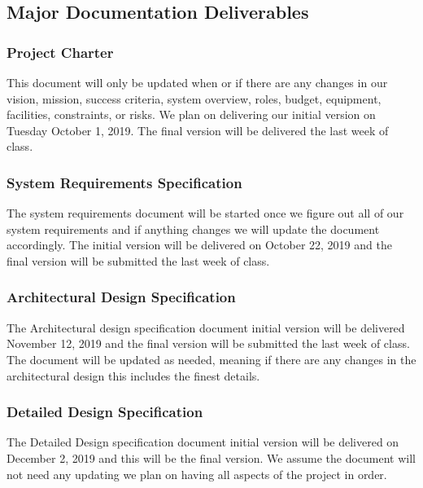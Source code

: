 
\subsection{Major Documentation Deliverables}
\subsubsection{Project Charter}
This document will only be updated when or if there are any changes in our vision, mission, success criteria, system overview, roles, budget, equipment, facilities, constraints, or risks. We plan on delivering our initial version on Tuesday October 1, 2019. The final version will be delivered the last week of class.
\subsubsection{System Requirements Specification}
The system requirements document will be started once we figure out all of our system requirements and if anything changes we will update the document accordingly.  The initial version will be delivered on October 22, 2019 and the final version will be submitted the last week of class.

\subsubsection{Architectural Design Specification}
The Architectural design specification document initial version will be delivered November 12, 2019 and the final version will be submitted the last week of class. The document will be updated as needed, meaning if there are any changes in the architectural design this includes the finest details.

\subsubsection{Detailed Design Specification}
The Detailed Design specification document initial version will be delivered on December 2, 2019 and this will be the final version. We assume the document will not need any updating we plan on having all aspects of the project in order.

